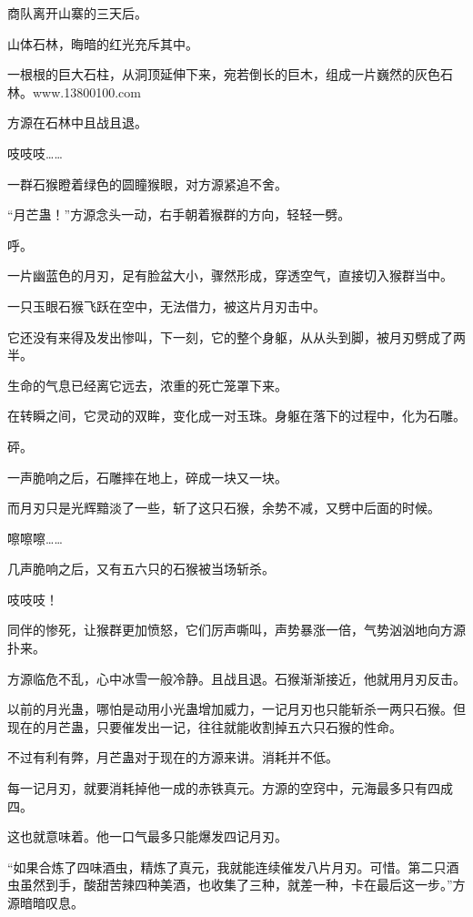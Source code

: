 
\begin{this_body}

商队离开山寨的三天后。

山体石林，晦暗的红光充斥其中。

一根根的巨大石柱，从洞顶延伸下来，宛若倒长的巨木，组成一片巍然的灰色石林。www.13800100.com

方源在石林中且战且退。

吱吱吱……

一群石猴瞪着绿色的圆瞳猴眼，对方源紧追不舍。

“月芒蛊！”方源念头一动，右手朝着猴群的方向，轻轻一劈。

呼。

一片幽蓝色的月刃，足有脸盆大小，骤然形成，穿透空气，直接切入猴群当中。

一只玉眼石猴飞跃在空中，无法借力，被这片月刃击中。

它还没有来得及发出惨叫，下一刻，它的整个身躯，从从头到脚，被月刃劈成了两半。

生命的气息已经离它远去，浓重的死亡笼罩下来。

在转瞬之间，它灵动的双眸，变化成一对玉珠。身躯在落下的过程中，化为石雕。

砰。

一声脆响之后，石雕摔在地上，碎成一块又一块。

而月刃只是光辉黯淡了一些，斩了这只石猴，余势不减，又劈中后面的时候。

嚓嚓嚓……

几声脆响之后，又有五六只的石猴被当场斩杀。

吱吱吱！

同伴的惨死，让猴群更加愤怒，它们厉声嘶叫，声势暴涨一倍，气势汹汹地向方源扑来。

方源临危不乱，心中冰雪一般冷静。且战且退。石猴渐渐接近，他就用月刃反击。

以前的月光蛊，哪怕是动用小光蛊增加威力，一记月刃也只能斩杀一两只石猴。但现在的月芒蛊，只要催发出一记，往往就能收割掉五六只石猴的性命。

不过有利有弊，月芒蛊对于现在的方源来讲。消耗并不低。

每一记月刃，就要消耗掉他一成的赤铁真元。方源的空窍中，元海最多只有四成四。

这也就意味着。他一口气最多只能爆发四记月刃。

“如果合炼了四味酒虫，精炼了真元，我就能连续催发八片月刃。可惜。第二只酒虫虽然到手，酸甜苦辣四种美酒，也收集了三种，就差一种，卡在最后这一步。”方源暗暗叹息。


\end{this_body}
